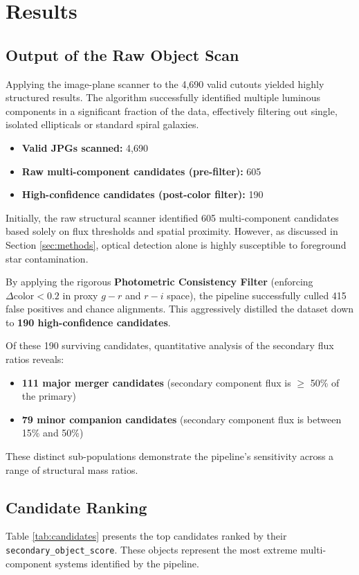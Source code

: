\documentclass[twocolumn]{aastex631}
\begin{document}
\section{Results} \label{sec:results}

\subsection{Output of the Raw Object Scan}
Applying the image-plane scanner to the 4,690 valid cutouts yielded highly structured results. The algorithm successfully identified multiple luminous components in a significant fraction of the data, effectively filtering out single, isolated ellipticals or standard spiral galaxies.
\begin{itemize}
    \item \textbf{Valid JPGs scanned:} 4,690
    \item \textbf{Raw multi-component candidates (pre-filter):} 605
    \item \textbf{High-confidence candidates (post-color filter):} 190
\end{itemize}
Initially, the raw structural scanner identified 605 multi-component candidates based solely on flux thresholds and spatial proximity. However, as discussed in Section \ref{sec:methods}, optical detection alone is highly susceptible to foreground star contamination. 

By applying the rigorous \textbf{Photometric Consistency Filter} (enforcing $\Delta \text{color} < 0.2$ in proxy $g-r$ and $r-i$ space), the pipeline successfully culled 415 false positives and chance alignments. This aggressively distilled the dataset down to \textbf{190 high-confidence candidates}. 

Of these 190 surviving candidates, quantitative analysis of the secondary flux ratios reveals:
\begin{itemize}
    \item \textbf{111 major merger candidates} (secondary component flux is $\ge$ 50\% of the primary)
    \item \textbf{79 minor companion candidates} (secondary component flux is between 15\% and 50\%)
\end{itemize}
These distinct sub-populations demonstrate the pipeline's sensitivity across a range of structural mass ratios.

\subsection{Candidate Ranking}
Table \ref{tab:candidates} presents the top candidates ranked by their \texttt{secondary\_object\_score}. These objects represent the most extreme multi-component systems identified by the pipeline.
\end{document}
